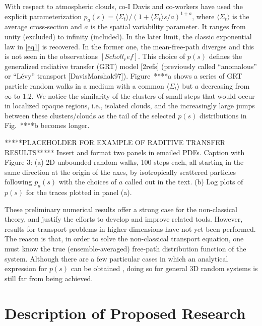 \documentclass[12pt]{article}
\begin{document}
With respect to atmospheric clouds, co-I Davis and co-workers have used the explicit parameterization $p_a(s) = \langle\Sigma_t\rangle/\left(1+\langle\Sigma_t\rangle s/a\right)^{1+a}$, where $\langle\Sigma_t\rangle$ is the average cross-section and $a$ is the spatial variability parameter.  It ranges from unity (excluded) to infinity (included).  In the later limit, the classic exponential law in \cref{eq1} is recovered.  In the former one, the mean-free-path diverges and this is not seen in the observations $[Scholl_ref]$.  This choice of $p(s)$ defines the generalized radiative transfer (GRT) model [2refs] (previously called ``anomalous'' or ``L\'evy'' transport [DavisMarshak97]).  Figure~****a shows a series of GRT particle random walks in a medium with a common $\langle\Sigma_t\rangle$ but $a$ decreasing from $\infty$ to 1.2.  We notice the similarity of the clusters of small steps that would occur in localized opaque regions, i.e., isolated clouds, and the increasingly large jumps between these clusters/clouds as the tail of the selected $p(s)$ distributions in Fig.~****b becomes longer.

\begin{center}
*****PLACEHOLDER FOR EXAMPLE OF RADITIVE TRANSFER RESULTS*****
Insert and format two panels in emailed PDFs.  Caption with
{Figure 3: (a) 2D unbounded random walks, 100 steps each, all starting in the same direction at the origin of the axes, by isotropically scattered particles following $p_a(s)$ with the choices of $a$ called out in the text.  (b) Log plots of $p(s)$ for the traces plotted in panel (a).}
\end{center}

These preliminary numerical results offer a strong case for the non-classical theory, and justify the efforts to develop and improve related tools.
However, results for transport problems in higher dimensions have not yet been performed. The reason is that, in order to solve the non-classical transport equation, one must know the true (ensemble-averaged) free-path distribution function of the system.
Although there are a few particular cases in which an analytical expression for $p(s)$ can be obtained \cite{vaskry16,vassla16}, doing so for general 3D random systems is still far from being achieved.

\section{Description of Proposed Research}
\end{document}
